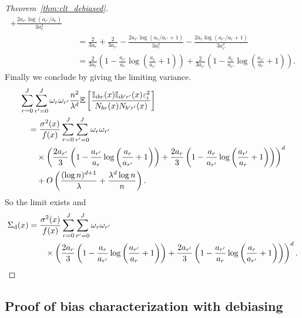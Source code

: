 \begin{proof}[Theorem~\ref{thm:clt_debiased}]
\begin{align*}
    + \frac{2 a_{r'} \log (a_{r'} / a_{r})}{3 a_r^2} \\
    &\quad=
    \frac{2}{3 a_r}
    + \frac{2}{3 a_{r'}}
    - \frac{2 a_{r'} \log(a_{r} / a_{r'} + 1)}{3 a_r^2}
    - \frac{2 a_r \log(a_{r'} / a_{r} + 1)}{3 a_{r'}^2} \\
    &\quad=
    \frac{2}{3 a_r}
    \left(
      1 - \frac{a_{r'}}{a_r}
      \log\left(\frac{a_{r}}{a_{r'}} + 1\right)
    \right)
    + \frac{2}{3 a_{r'}}
    \left(
      1 - \frac{a_r }{a_{r'}}
      \log\left(\frac{a_{r'}}{a_{r}} + 1\right)
    \right).
  \end{align*}
  Finally we conclude by giving the limiting variance.
  \begin{align*}
    &\sum_{r=0}^{J}
    \sum_{r'=0}^{J}
    \omega_r
    \omega_{r'}
    \frac{n^2}{\lambda^d}
    \mathbb{E} \left[
      \frac{\mathbb{I}_{i b r}(x) \mathbb{I}_{i b' r'}(x) \varepsilon_i^2}
      {N_{b r}(x) N_{b' r'}(x)}
    \right] \\
    &\quad=
    \frac{\sigma^2(x)}{f(x)}
    \sum_{r=0}^{J}
    \sum_{r'=0}^{J}
    \omega_r
    \omega_{r'} \\
    &\qquad\times
    \left(
      \frac{2 a_{r'}}{3}
      \left(
        1 - \frac{a_{r'}}{a_r}
        \log\left(\frac{a_r}{a_{r'}} + 1\right)
      \right)
      + \frac{2 a_r}{3}
      \left(
        1 - \frac{a_r}{a_{r'}}
        \log\left(\frac{a_{r'}}{a_r} + 1\right)
      \right)
    \right)^d \\
    &\qquad+
    O \left(
      \frac{(\log n)^{d+1}}{\lambda}
      + \frac{\lambda^d \log n}{n}
    \right).
  \end{align*}
  So the limit exists and
  \begin{align*}
    \Sigma_{\mathrm{d}}(x)
    &=
    \frac{\sigma^2(x)}{f(x)}
    \sum_{r=0}^{J}
    \sum_{r'=0}^{J}
    \omega_r
    \omega_{r'} \\
    &\qquad\times
    \left(
      \frac{2 a_r}{3}
      \left(
        1 - \frac{a_r}{a_{r'}}
        \log\left(\frac{a_{r'}}{a_r} + 1\right)
      \right)
      + \frac{2 a_{r'}}{3}
      \left(
        1 - \frac{a_{r'}}{a_r}
        \log\left(\frac{a_r}{a_{r'}} + 1\right)
      \right)
    \right)^d.
  \end{align*}
\end{proof}

\subsection*{Proof of bias characterization with debiasing}

